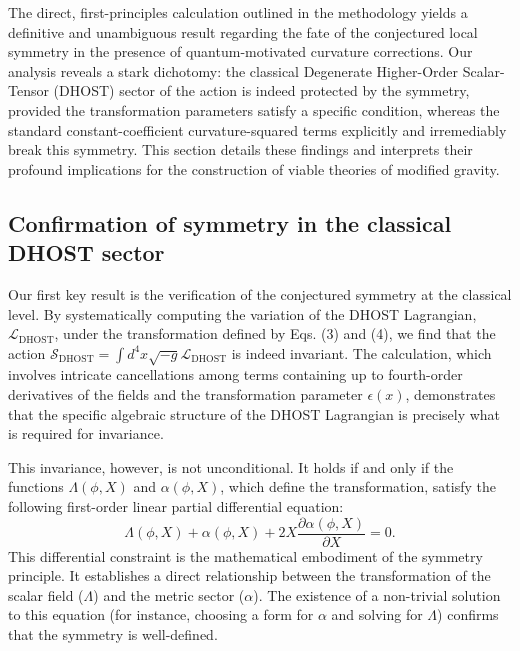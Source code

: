 \documentclass[twocolumn]{aastex631}
\begin{document}
The direct, first-principles calculation outlined in the methodology yields a definitive and unambiguous result regarding the fate of the conjectured local symmetry in the presence of quantum-motivated curvature corrections. Our analysis reveals a stark dichotomy: the classical Degenerate Higher-Order Scalar-Tensor (DHOST) sector of the action is indeed protected by the symmetry, provided the transformation parameters satisfy a specific condition, whereas the standard constant-coefficient curvature-squared terms explicitly and irremediably break this symmetry. This section details these findings and interprets their profound implications for the construction of viable theories of modified gravity.

\subsection{Confirmation of symmetry in the classical DHOST sector}

Our first key result is the verification of the conjectured symmetry at the classical level. By systematically computing the variation of the DHOST Lagrangian, $\mathcal{L}_{\text{DHOST}}$, under the transformation defined by Eqs. (3) and (4), we find that the action $\mathcal{S}_{\text{DHOST}} = \int d^4x \sqrt{-g} \mathcal{L}_{\text{DHOST}}$ is indeed invariant. The calculation, which involves intricate cancellations among terms containing up to fourth-order derivatives of the fields and the transformation parameter $\epsilon(x)$, demonstrates that the specific algebraic structure of the DHOST Lagrangian is precisely what is required for invariance.

This invariance, however, is not unconditional. It holds if and only if the functions $\Lambda(\phi, X)$ and $\alpha(\phi, X)$, which define the transformation, satisfy the following first-order linear partial differential equation:
\begin{equation}
\Lambda(\phi, X) + \alpha(\phi, X) + 2X \frac{\partial \alpha(\phi, X)}{\partial X} = 0.
\label{eq:dhost_condition}
\end{equation}
This differential constraint is the mathematical embodiment of the symmetry principle. It establishes a direct relationship between the transformation of the scalar field ($\Lambda$) and the metric sector ($\alpha$). The existence of a non-trivial solution to this equation (for instance, choosing a form for $\alpha$ and solving for $\Lambda$) confirms that the symmetry is well-defined.
\end{document}
